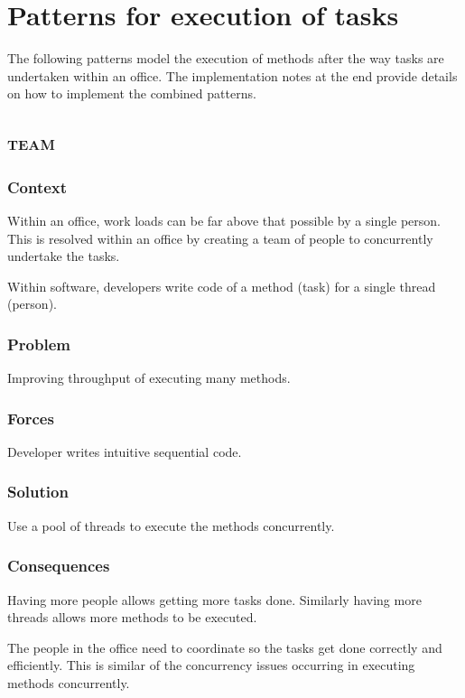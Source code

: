 \documentclass[prodmode]{style/acmlarge}
\begin{document}
\section{Patterns for execution of tasks}

The following patterns model the execution of methods after the way tasks are
undertaken within an office.  The implementation notes at the end provide
details on how to implement the combined patterns.


\subsection{\textsc{\textbf{team}}}

\subsubsection*{Context} Within an office, work loads can be far above that
possible by a single person. This is resolved within an office by creating a
team of people to concurrently undertake the tasks.

Within software, developers write code of a method (task) for a single thread
(person).

\subsubsection*{\textbf{Problem}} Improving throughput of executing many methods.

\subsubsection*{Forces} Developer writes intuitive sequential code.

\subsubsection*{\textbf{Solution}} Use a pool of threads to execute the methods
concurrently.

\subsubsection*{Consequences} Having more people allows getting more tasks done.
Similarly having more threads allows more methods to be executed.

The people in the office need to coordinate so the tasks get done correctly and
efficiently.  This is similar of the concurrency issues occurring in executing
methods concurrently.
\end{document}
